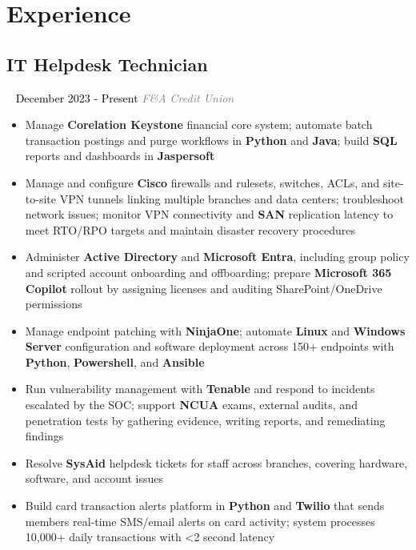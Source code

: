 \documentclass{article}
\newcommand{\resumesection}[3]{
    \subsection*{#1}
    \ 
    \normalsize
    \normalsize
    \hfill
    \textcolor{black}{#3}
    \normalsize
    \newline
    \small
    \textcolor{grey}{\emph{#2}}
}
\begin{document}
\pagestyle{useheader}
\section*{Experience}
\resumesection{IT Helpdesk Technician}{F\&A Credit Union}{December 2023 - Present}
\begin{itemize}
	\item Manage \textbf{Corelation Keystone} financial core system; automate batch transaction postings and purge workflows in \textbf{Python} and \textbf{Java}; build \textbf{SQL} reports and dashboards in \textbf{Jaspersoft}
	\item Manage and configure \textbf{Cisco} firewalls and rulesets, switches, ACLs, and site-to-site VPN tunnels linking multiple branches and data centers; troubleshoot network issues; monitor VPN connectivity and \textbf{SAN} replication latency to meet RTO/RPO targets and maintain disaster recovery procedures
	\item Administer \textbf{Active Directory} and \textbf{Microsoft Entra}, including group policy and scripted account onboarding and offboarding; prepare \textbf{Microsoft 365 Copilot} rollout by assigning licenses and auditing SharePoint/OneDrive permissions
	\item Manage endpoint patching with \textbf{NinjaOne}; automate \textbf{Linux} and \textbf{Windows Server} configuration and software deployment across 150+ endpoints with \textbf{Python}, \textbf{Powershell}, and \textbf{Ansible}
	\item Run vulnerability management with \textbf{Tenable} and respond to incidents escalated by the SOC; support \textbf{NCUA} exams, external audits, and penetration tests by gathering evidence, writing reports, and remediating findings
	\item Resolve \textbf{SysAid} helpdesk tickets for staff across branches, covering hardware, software, and account issues
	\item Build card transaction alerts platform in \textbf{Python} and \textbf{Twilio} that sends members real-time SMS/email alerts on card activity; system processes 10,000+ daily transactions with \textless 2 second latency
\end{itemize}
\end{document}
